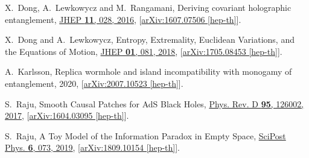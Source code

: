 \documentclass[11pt]{article}
\numberwithin{equation}{section}
\begin{document}
\begin{thebibliography}{10}
X.~Dong, A.~Lewkowycz and M.~Rangamani, {{Deriving covariant holographic
  entanglement}}, \href{http://dx.doi.org/10.1007/JHEP11(2016)028}{JHEP {\bf
  11}, 028, 2016},
  [\href{http://arxiv.org/abs/arXiv:1607.07506}{{arXiv:1607.07506 [hep-th]}}].

X.~Dong and A.~Lewkowycz, {{Entropy, Extremality, Euclidean Variations, and the
  Equations of Motion}}, \href{http://dx.doi.org/10.1007/JHEP01(2018)081}{JHEP
  {\bf 01}, 081, 2018},
  [\href{http://arxiv.org/abs/arXiv:1705.08453}{{arXiv:1705.08453 [hep-th]}}].

A.~Karlsson, {{Replica wormhole and island incompatibility with monogamy of
  entanglement}},  2020,
  [\href{http://arxiv.org/abs/arXiv:2007.10523}{{arXiv:2007.10523 [hep-th]}}].

S.~Raju, {{Smooth Causal Patches for AdS Black Holes}},
  \href{http://dx.doi.org/10.1103/PhysRevD.95.126002}{Phys. Rev. D {\bf 95},
  126002, 2017},
  [\href{http://arxiv.org/abs/arXiv:1604.03095}{{arXiv:1604.03095 [hep-th]}}].

S.~Raju, {{A Toy Model of the Information Paradox in Empty Space}},
  \href{http://dx.doi.org/10.21468/SciPostPhys.6.6.073}{SciPost Phys. {\bf 6},
  073, 2019}, [\href{http://arxiv.org/abs/arXiv:1809.10154}{{arXiv:1809.10154
  [hep-th]}}].

\end{thebibliography}\endgroup
\end{document}
